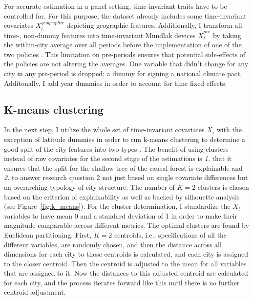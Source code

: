 \documentclass[12pt, a4paper]{article}
\begin{document}
For accurate estimation in a panel setting, time-invariant traits have to be controlled for. For this purpose, the dataset already includes some time-invariant covariates $X^{geographic}_i$ depicting geographic features. Additionally, I transform all time-, non-dummy features into time-invariant Mundlak devices $\bar X^{pre}_i$ by taking the within-city average over all periods before the implementation of one of the two policies \citep[See][]{mundlakPoolingTimeSeries1978}. This limitation on pre-periods ensures that potential side-effects of the policies are not altering the averages. One variable that didn't change for any city in any pre-period is dropped: a dummy for signing a national climate pact. Additonally, I add year dummies in order to account for time fixed effects.

\subsection*{K-means clustering}
\label{sec:cluster}

In the next step, I utilize the whole set of time-invariant covariates $X_i$ with the exception of latitude dummies in order to run k-means clustering to determine a good split of the city features into two types \citep[See][Ch. 12.4.1]{jamesIntroductionStatisticalLearning2023}. The benefit of using clusters instead of raw covariates for the second stage of the estimations is \textit{1.} that it ensures that the split for the shallow tree of the causal forest is explainable and \textit{2.} to answer research question 2 not just based on single covariate differences but an overarching typology of city structure. The number of $K=2$ clusters is chosen based on the criterion of explainability as well as backed by silhouette analysis (see Figure~\ref{fig:k_means}). For the cluster determination, I standardize the $X_i$ variables to have mean 0 and a standard deviation of 1 in order to make their magnitude comparable across different metrics. The optimal clusters are found by Euclidean partitioning. First, $K=2$ centroids, i.e., specifications of all the different variables, are randomly chosen, and then the distance across all dimensions for each city to those centroids is calculated, and each city is assigned to the closer centroid. Then the centroid is adjusted to the mean for all variables that are assigned to it. Now the distances to this adjusted centroid are calculated for each city, and the process iterates forward like this until there is no further centroid adjustment.
\end{document}
